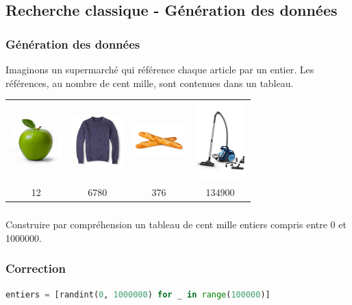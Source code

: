 \documentclass[svgnames,11pt]{beamer}
\begin{document}
\subsection{Recherche classique - Génération des données}
\begin{frame}
    \frametitle{Génération des données}
    Imaginons un supermarché qui référence chaque article par un entier. Les références, au nombre de cent mille, sont contenues dans un tableau.

\begin{center}
    \begin{tabular}{*{4}{c}}
        \includegraphics[width=2cm]{ressources/pomme.jpg}&
        \includegraphics[width=2cm]{ressources/pull.jpg}&
        \includegraphics[width=2cm]{ressources/pain.jpg}&
        \includegraphics[width=2cm]{ressources/aspirateur.jpg}\\
        12&6780&376&134900\\
    \end{tabular}
\end{center}
\end{frame}
\begin{frame}
    \frametitle{}

    \begin{activite}
        Construire par compréhension un tableau de cent mille entiers compris entre 0 et 1000000.
    \end{activite}

\end{frame}
\begin{frame}[fragile]
    \frametitle{Correction}

    \begin{center}
    \begin{lstlisting}[language=Python , basicstyle=\ttfamily\small, xleftmargin=0.2em, xrightmargin=-1em]
entiers = [randint(0, 1000000) for _ in range(100000)]
\end{lstlisting}
    \label{CODE}
    \end{center}

\end{frame}
\end{document}
